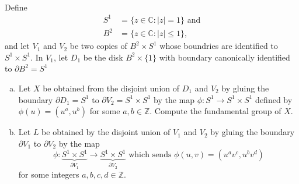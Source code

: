 \documentclass{article}
\newenvironment{problem}[2][Problem]{\begin{trivlist}
\item[\hskip \labelsep {\bfseries #1}\hskip \labelsep {\bfseries #2.}]}{\end{trivlist}}
\begin{document}
\pagebreak
\begin{problem}{2} \text{} \\
  Define \begin{align*}
      S^1 &= \{z \in \mathbb C : |z| = 1 \} \text{ and}\\
      B^2 &= \{z \in \mathbb C : |z| \leq 1 \},
  \end{align*} and let $V_1$ and $V_2$ be two copies of $B^2 \times S^1$ whose
  boundries are identified to $S^1 \times S^1$.
  In $V_1$, let $D_1$ be the disk $B^2 \times \{ 1 \}$ with boundary canonically
  identified to $\partial B^2 = S^1$
  \begin{enumerate}[a.]
    \item Let $X$ be obtained from the disjoint union of $D_1$ and $V_2$ by
    gluing the boundary $\partial D_1 = S^1$ to $\partial V_2 = S^1 \times S^1$
    by the map $\phi\colon S^1 \rightarrow S^1 \times S^1$ defined by
    $\phi(u) = (u^a, u^b)$ for some $a, b \in \mathbb Z$. Compute the
    fundamental group of $X$.
    \item Let $L$ be obtained by the disjoint union of $V_1$ and $V_2$ by gluing the boundary $\partial V_1$ to $\partial V_2$ by the map \[
      \phi\colon \underbrace{S^1 \times S^1}_{\partial V_1}
      \rightarrow \underbrace{S^1 \times S^1}_{\partial V_2}
      \text{ which sends }
      \phi(u, v) = (u^av^c, u^bv^d)
    \] for some integers $a, b, c, d \in \mathbb Z$.
  \end{enumerate}
\end{problem}
\end{document}
